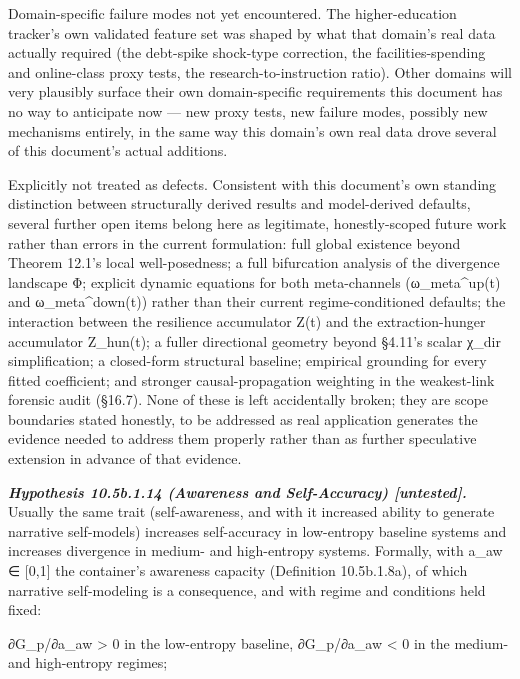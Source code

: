 \documentclass[
]{article}
\begin{document}
Domain-specific failure modes not yet encountered. The higher-education
tracker's own validated feature set was shaped by what that domain's
real data actually required (the debt-spike shock-type correction, the
facilities-spending and online-class proxy tests, the
research-to-instruction ratio). Other domains will very plausibly
surface their own domain-specific requirements this document has no way
to anticipate now --- new proxy tests, new failure modes, possibly new
mechanisms entirely, in the same way this domain's own real data drove
several of this document's actual additions.

Explicitly not treated as defects. Consistent with this document's own
standing distinction between structurally derived results and
model-derived defaults, several further open items belong here as
legitimate, honestly-scoped future work rather than errors in the
current formulation: full global existence beyond Theorem 12.1's local
well-posedness; a full bifurcation analysis of the divergence landscape
Φ; explicit dynamic equations for both meta-channels (ω\_meta\^{}up(t)
and ω\_meta\^{}down(t)) rather than their current regime-conditioned
defaults; the interaction between the resilience accumulator Z(t) and
the extraction-hunger accumulator Z\_hun(t); a fuller directional
geometry beyond §4.11's scalar χ\_dir simplification; a closed-form
structural baseline; empirical grounding for every fitted coefficient;
and stronger causal-propagation weighting in the weakest-link forensic
audit (§16.7). None of these is left accidentally broken; they are scope
boundaries stated honestly, to be addressed as real application
generates the evidence needed to address them properly rather than as
further speculative extension in advance of that evidence.

\emph{\textbf{Hypothesis 10.5b.1.14 (Awareness and Self-Accuracy)
{[}untested{]}.}} Usually the same trait (self-awareness, and with it
increased ability to generate narrative self-models) increases
self-accuracy in low-entropy baseline systems and increases divergence
in medium- and high-entropy systems. Formally, with a\_aw ∈ {[}0,1{]}
the container's awareness capacity (Definition 10.5b.1.8a), of which
narrative self-modeling is a consequence, and with regime and conditions
held fixed:

∂G\_p/∂a\_aw \textgreater{} 0 in the low-entropy baseline, ∂G\_p/∂a\_aw
\textless{} 0 in the medium- and high-entropy regimes;
\end{document}
